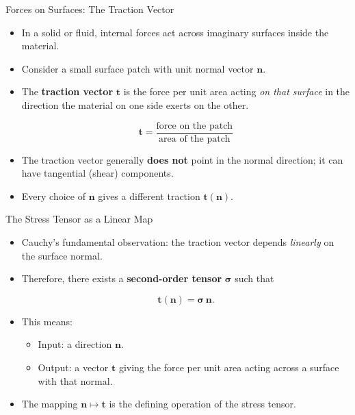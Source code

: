 \documentclass[aspectratio=169,11pt]{beamer}
\begin{document}
\begin{frame}{Forces on Surfaces: The Traction Vector}

\begin{itemize}

\item In a solid or fluid, internal forces act across imaginary surfaces inside the material.
\item Consider a small surface patch with unit normal vector $\mathbf{n}$.
\item The \textbf{traction vector} $\mathbf{t}$ is the force per unit area acting \emph{on that surface} in the direction the material on one side exerts on the other.

\[
\mathbf{t} = \frac{\text{force on the patch}}{\text{area of the patch}}
\]

\item The traction vector generally \textbf{does not} point in the normal direction; it can have tangential (shear) components.
\item Every choice of $\mathbf{n}$ gives a different traction $\mathbf{t}(\mathbf{n})$.
\end{itemize}

\end{frame}

\begin{frame}{The Stress Tensor as a Linear Map}

\begin{itemize}

\item Cauchy’s fundamental observation: the traction vector depends \emph{linearly} on the surface normal.
\item Therefore, there exists a \textbf{second-order tensor} $\boldsymbol{\sigma}$ such that

\[
\mathbf{t}(\mathbf{n}) = \boldsymbol{\sigma}\,\mathbf{n}.
\]

\item This means:
\begin{itemize}
  \item Input: a direction $\mathbf{n}$.
  \item Output: a vector $\mathbf{t}$ giving the force per unit area acting across a surface with that normal.
\end{itemize}

\item The mapping $\mathbf{n} \mapsto \mathbf{t}$ is the defining operation of the stress tensor.
\end{itemize}

\end{frame}
\end{document}

